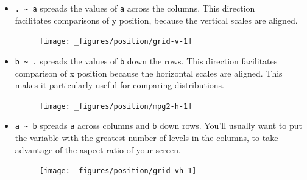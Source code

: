 \begin{itemize}
\item
  \texttt{.\ \textasciitilde{}\ a} spreads the values of \texttt{a}
  across the columns. This direction\\
  facilitates comparisons of y position, because the vertical scales are
  aligned.

\begin{Shaded}
\begin{Highlighting}[]
\OperatorTok{+}\StringTok{ }\OperatorTok{~}\StringTok{ }
\end{Highlighting}
\end{Shaded}

  \begin{figure}[H]
     \centering
     \texttt{[image: \_figures/position/grid-v-1]}
   \end{figure}
\item
  \texttt{b\ \textasciitilde{}\ .} spreads the values of \texttt{b} down
  the rows. This direction facilitates comparison of x position because
  the horizontal scales are aligned. This makes it particularly useful
  for comparing distributions.

\begin{Shaded}
\begin{Highlighting}[]
\OperatorTok{+}\StringTok{ }\OperatorTok{~}\StringTok{ }
\end{Highlighting}
\end{Shaded}

  \begin{figure}[H]
    \centering
    \texttt{[image: \_figures/position/mpg2-h-1]}
  \end{figure}
\item
  \texttt{a\ \textasciitilde{}\ b} spreads \texttt{a} across columns and
  \texttt{b} down rows. You'll usually want to put the variable with the
  greatest number of levels in the columns, to take advantage of the
  aspect ratio of your screen.

\begin{Shaded}
\begin{Highlighting}[]
\OperatorTok{+}\StringTok{ }\OperatorTok{~}\StringTok{ }
\end{Highlighting}
\end{Shaded}

  \begin{figure}[H]
    \centering
    \texttt{[image: \_figures/position/grid-vh-1]}
  \end{figure}
\end{itemize}

